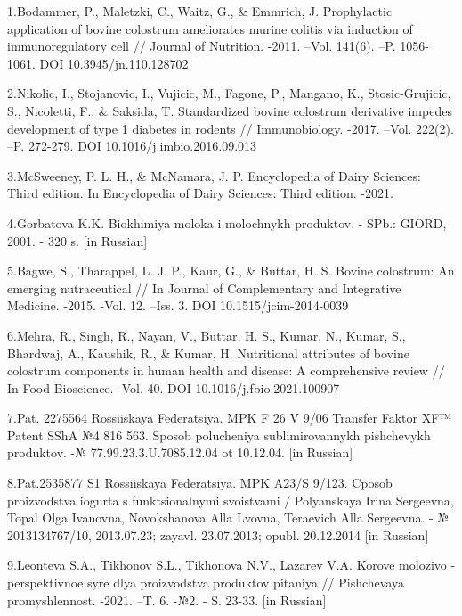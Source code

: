 \begin{noparindent}
1.Bodammer, P., Maletzki, C., Waitz, G., \& Emmrich, J. Prophylactic
  application of bovine colostrum ameliorates murine colitis via
  induction of immunoregulatory cell // Journal of Nutrition. -2011.
  --Vol. 141(6). --P. 1056-1061. DOI 10.3945/jn.110.128702

2.Nikolic, I., Stojanovic, I., Vujicic, M., Fagone, P., Mangano, K.,
  Stosic-Grujicic, S., Nicoletti, F., \& Saksida, T. Standardized bovine
  colostrum derivative impedes development of type 1 diabetes in rodents
  // Immunobiology. -2017. --Vol. 222(2). --P. 272-279. DOI
  10.1016/j.imbio.2016.09.013

3.McSweeney, P. L. H., \& McNamara, J. P. Encyclopedia of Dairy
  Sciences: Third edition. In Encyclopedia of Dairy Sciences: Third
  edition. -2021.

4.Gorbatova K.K. Biokhimiya moloka i molochnykh produktov. - SPb.:
  GIORD, 2001. - 320 s. {[}in Russian{]}

5.Bagwe, S., Tharappel, L. J. P., Kaur, G., \& Buttar, H. S. Bovine
  colostrum: An emerging nutraceutical // In Journal of Complementary
  and Integrative Medicine. -2015. -Vol. 12. --Iss. 3. DOI
  10.1515/jcim-2014-0039

6.Mehra, R., Singh, R., Nayan, V., Buttar, H. S., Kumar, N., Kumar, S.,
  Bhardwaj, A., Kaushik, R., \& Kumar, H. Nutritional attributes of
  bovine colostrum components in human health and disease: A
  comprehensive review // In Food Bioscience. -Vol. 40. DOI
  10.1016/j.fbio.2021.100907

7.Pat. 2275564 Rossiiskaya Federatsiya. MPK F 26 V 9/06 Transfer Faktor
  XF™ Patent SShA №4 816 563. Sposob polucheniya sublimirovannykh
  pishchevykh produktov. -№ 77.99.23.3.U.7085.12.04 ot 10.12.04. {[}in
  Russian{]}

8.Pat.2535877 S1 Rossiiskaya Federatsiya. MPK A23/S 9/123. Cposob
  proizvodstva iogurta s funktsional\textquotesingle nymi svoistvami /
  Polyanskaya Irina Sergeevna, Topal Ol\textquotesingle ga Ivanovna,
  Novokshanova Alla L\textquotesingle vovna, Teraevich Alla Sergeevna. -
  № 2013134767/10, 2013.07.23; zayavl. 23.07.2013; opubl. 20.12.2014
  {[}in Russian{]}

9.Leont\textquotesingle eva S.A., Tikhonov S.L., Tikhonova N.V., Lazarev
  V.A. Korov\textquotesingle e molozivo - perspektivnoe
  syr\textquotesingle e dlya proizvodstva produktov pitaniya //
  Pishchevaya promyshlennost\textquotesingle. -2021. --T. 6. -№2. - S.
  23-33. {[}in Russian{]}


\end{noparindent}
